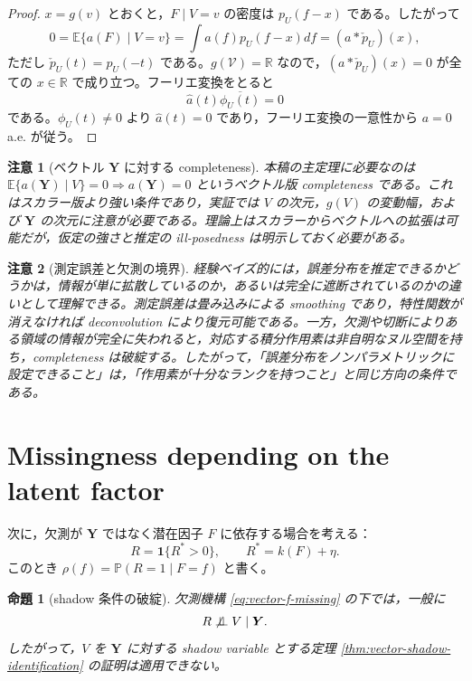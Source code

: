 \documentclass[10pt,a4paper]{article}
\newtheorem{proposition}{命題}
\newtheorem{remark}{注意}
\newcommand{\indep}{\mathrel{\perp\!\!\!\perp}}
\newcommand{\E}{\mathbb{E}}
\newcommand{\Prb}{\mathbb{P}}
\newcommand{\R}{\mathbb{R}}
\newcommand{\1}{\mathbf{1}}
\newcommand{\calV}{\mathcal{V}}
\newcommand{\Y}{\bm{Y}}
\begin{document}
\begin{proof}
$x=g(v)$ とおくと，$F\mid V=v$ の密度は $p_U(f-x)$ である。したがって
\begin{equation}
  0=\E\{a(F)\mid V=v\}=\int a(f)p_U(f-x)df=(a*\check p_U)(x),
\end{equation}
ただし $\check p_U(t)=p_U(-t)$ である。$g(\calV)=\R$ なので，$(a*\check p_U)(x)=0$ が全ての $x\in\R$ で成り立つ。フーリエ変換をとると
\begin{equation}
  \widehat a(t)\overline{\phi_U(t)}=0
\end{equation}
である。$\phi_U(t)\neq0$ より $\widehat a(t)=0$ であり，フーリエ変換の一意性から $a=0$ a.e. が従う。
\end{proof}

\begin{remark}[ベクトル $\Y$ に対する completeness]
本稿の主定理に必要なのは $\E\{a(\Y)\mid V\}=0\Rightarrow a(\Y)=0$ というベクトル版 completeness である。これはスカラー版より強い条件であり，実証では $V$ の次元，$g(V)$ の変動幅，および $\Y$ の次元に注意が必要である。理論上はスカラーからベクトルへの拡張は可能だが，仮定の強さと推定の ill-posedness は明示しておく必要がある。
\end{remark}

\begin{remark}[測定誤差と欠測の境界]
経験ベイズ的には，誤差分布を推定できるかどうかは，情報が単に拡散しているのか，あるいは完全に遮断されているのかの違いとして理解できる。測定誤差は畳み込みによる smoothing であり，特性関数が消えなければ deconvolution により復元可能である。一方，欠測や切断によりある領域の情報が完全に失われると，対応する積分作用素は非自明なヌル空間を持ち，completeness は破綻する。したがって，「誤差分布をノンパラメトリックに設定できること」は，「作用素が十分なランクを持つこと」と同じ方向の条件である。
\end{remark}

\section{Missingness depending on the latent factor}
\label{app:latent-factor-missingness}

次に，欠測が $\Y$ ではなく潜在因子 $F$ に依存する場合を考える：
\begin{equation}
  R=\1\{R^*>0\},
  \qquad
  R^*=k(F)+\eta.
  \label{eq:vector-f-missing}
\end{equation}
このとき $\rho(f)=\Prb(R=1\mid F=f)$ と書く。

\begin{proposition}[shadow 条件の破綻]
\label{prop:vector-f-missing-not-shadow}
欠測機構 \eqref{eq:vector-f-missing} の下では，一般に
\begin{equation}
  R\not\indep V\mid \Y.
\end{equation}
したがって，$V$ を $\Y$ に対する shadow variable とする定理 \ref{thm:vector-shadow-identification} の証明は適用できない。
\end{proposition}
\end{document}
